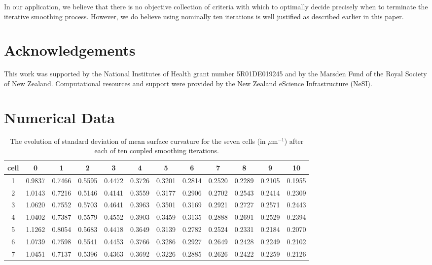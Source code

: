 \documentclass[a4paper,10pt]{article}
\begin{document}
In our application, we believe that there is no objective collection of criteria with which to optimally decide precisely when to terminate the iterative smoothing process. However, we do believe using nominally ten iterations is well justified as described earlier in this paper.\\

\section{Acknowledgements}
This work was supported by the National Institutes of Health grant number 5R01DE019245 and by the Marsden Fund of the Royal Society of New Zealand. Computational resources and support were provided by the New Zealand eScience Infrastructure (NeSI).\\




\pagebreak
\appendix

\section{Numerical Data}

\begin{table}[H]
\begin{center}
\footnotesize
\begin{tabular}{|c|ccccccccccc|}
\hline
cell & 0 &1 &2 &3 &4 &5 &6 &7 &8 &9 &10\\
\hline

1 &0.9837 &0.7466 &0.5595 &0.4472 &0.3726 &0.3201 &0.2814 &0.2520 &0.2289 &0.2105 &0.1955\\
2 &1.0143 &0.7216 &0.5146 &0.4141 &0.3559 &0.3177 &0.2906 &0.2702 &0.2543 &0.2414 &0.2309\\
3 &1.0620 &0.7552 &0.5703 &0.4641 &0.3963 &0.3501 &0.3169 &0.2921 &0.2727 &0.2571 &0.2443\\
4 &1.0402 &0.7387 &0.5579 &0.4552 &0.3903 &0.3459 &0.3135 &0.2888 &0.2691 &0.2529 &0.2394\\
5 &1.1262 &0.8054 &0.5683 &0.4418 &0.3649 &0.3139 &0.2782 &0.2524 &0.2331 &0.2184 &0.2070\\
6 &1.0739 &0.7598 &0.5541 &0.4453 &0.3766 &0.3286 &0.2927 &0.2649 &0.2428 &0.2249 &0.2102\\
7 &1.0451 &0.7137 &0.5396 &0.4363 &0.3692 &0.3226 &0.2885 &0.2626 &0.2422 &0.2259 &0.2126\\
\hline
\end{tabular}
\end{center}
\caption{The evolution of standard deviation of mean surface curvature for the seven cells (in $\mu \text{m}^{-1}$)  after each of ten coupled smoothing iterations.}
\label{tab:curv}
\end{table}
\end{document}
